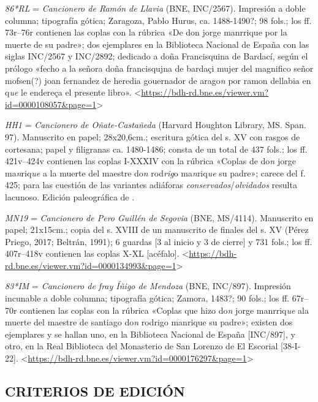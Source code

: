 \documentclass[11pt,a4paper,twoside]{article}
\newcommand{\comillas}[1]{«#1»}
\newcommand{\rl}{\emph{86*RL}}
\newcommand{\hh}{\emph{HH1}}
\newcommand{\mn}{\emph{MN19}}
\newcommand{\im}{\emph{83*IM}}
\begin{document}
{\rl} = \emph{Cancionero de Ramón de Llavia} (BNE, INC/2567).
%
Impresión a doble columna; tipografía gótica; Zaragoza, Pablo Hurus, ca. 1488-1490?; 98 fols.; los ff. 73r--76r contienen las coplas con la rúbrica \comillas{De don jorge manrrique por la muerte de su padre}; dos ejemplares en la Biblioteca Nacional de España con las siglas INC/2567 y INC/2892; dedicado a doña Francisquina de Bardací, según el prólogo \comillas{fecho a la señora doña francisqujna de bardaçi mujer del magnifico señor mofsen(?) joan fernandez de heredia gouernador de arago\emph{n} por ramon dellabia en q\emph{ue} le endereça el presente libro}. <\url{https://bdh-rd.bne.es/viewer.vm?id=0000108057&page=1}>\par

{\hh} = \emph{Cancionero de Oñate-Castañeda} (Harvard Houghton Library, MS. Span. 97).
%
Manuscrito en papel; 28x20,6cm.; escritura gótica del s. XV con rasgos de cortesana; papel y filigranas ca. 1480-1486; consta de un total de 437 fols.; los ff. 421v--424v contienen las coplas I-XXXIV con la rúbrica \comillas{Coplas de do\emph{n} jorge ma\emph{n}riq\emph{ue} a la muerte del maestre do\emph{n} rod\emph{rig}o ma\emph{n}riq\emph{ue} su padre}; carece del f. 425; para las cuestión de las variantes adiáforas \emph{conservados}/\emph{olvidados} resulta lacunoso. Edición paleográfica de \textcite{Severin1990}.\par

{\mn} = \emph{Cancionero de Pero Guillén de Segovia} (BNE, MS/4114).
%
Manuscrito en papel; 21x15cm.; copia del s. XVIII de un manuscrito de finales del s. XV (Pérez Priego, 2017; Beltrán, 1991); 6 guardas [3 al inicio y 3 de cierre] y 731 fols.; los ff. 407r--418v contienen las coplas X-XL [acéfalo]. <\url{https://bdh-rd.bne.es/viewer.vm?id=0000134993&page=1}>\par

{\im} = \emph{Cancionero de fray Íñigo de Mendoza} (BNE, INC/897).
%
Impresión incunable a doble columna; tipografía gótica; Zamora, 1483?; 90 fols.; los ff. 67r--70r contienen las coplas con la rúbrica \comillas{Coplas que hizo do\emph{n} jorge manrriq\emph{ue} ala muerte del maestre de santiago do\emph{n} rodrigo manrique su padre}; existen dos ejemplares y se hallan uno, en la Biblioteca Nacional de España [INC/897], y otro, en la Real Biblioteca del Monasterio de San Lorenzo de El Escorial [38-I-22]. <\url{https://bdh-rd.bne.es/viewer.vm?id=0000176297&page=1}>\par
\relax
\vfill

\subsection*{\centering\normalsize CRITERIOS DE EDICIÓN}
\end{document}

